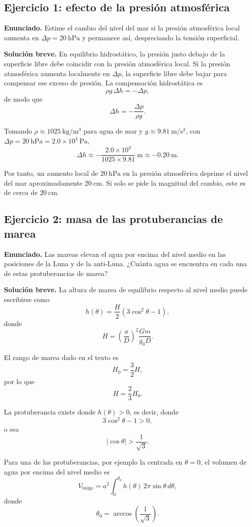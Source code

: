 \subsection{Ejercicio 1: efecto de la presión atmosférica}

\textbf{Enunciado.} Estime el cambio del nivel del mar si la presión atmosférica local aumenta en $\Delta p = 20\ \mathrm{hPa}$ y permanece así, despreciando la tensión superficial.

\textbf{Solución breve.} En equilibrio hidrostático, la presión justo debajo de la superficie libre debe coincidir con la presión atmosférica local. Si la presión atmosférica aumenta localmente en $\Delta p$, la superficie libre debe bajar para compensar ese exceso de presión. La compensación hidrostática es
$$ \rho g\,\Delta h = -\Delta p, $$
de modo que
$$ \Delta h = -\frac{\Delta p}{\rho g}. $$

Tomando $\rho \approx 1025\ \mathrm{kg/m^3}$ para agua de mar y $g \approx 9.81\ \mathrm{m/s^2}$, con $\Delta p = 20\ \mathrm{hPa} = 2.0\times 10^3\ \mathrm{Pa}$,
$$ \Delta h \approx -\frac{2.0\times 10^3}{1025 \times 9.81}\ \mathrm{m} \approx -0.20\ \mathrm{m}. $$

Por tanto, un aumento local de $20\ \mathrm{hPa}$ en la presión atmosférica deprime el nivel del mar aproximadamente $20\ \mathrm{cm}$. Si solo se pide la magnitud del cambio, este es de cerca de $20\ \mathrm{cm}$.

\subsection{Ejercicio 2: masa de las protuberancias de marea}

\textbf{Enunciado.} Las mareas elevan el agua por encima del nivel medio en las posiciones de la Luna y de la anti-Luna. ¿Cuánta agua se encuentra en cada una de estas protuberancias de marea?

\textbf{Solución breve.} La altura de marea de equilibrio respecto al nivel medio puede escribirse como
$$ h(\theta) = \frac{H}{2}(3\cos^2\theta - 1), $$
donde
$$ H = \left(\frac{a}{D}\right)^2\frac{Gm}{g_0D}. $$

El rango de marea dado en el texto es
$$ H_0 = \frac{3}{2}H, $$
por lo que
$$ H = \frac{2}{3}H_0. $$

La protuberancia existe donde $h(\theta) > 0$, es decir, donde
$$ 3\cos^2\theta - 1 > 0, $$
o sea
$$ |\cos\theta| > \frac{1}{\sqrt{3}}. $$

Para una de las protuberancias, por ejemplo la centrada en $\theta = 0$, el volumen de agua por encima del nivel medio es
$$ V_{\mathrm{bulge}} = a^2 \int_0^{\theta_0} h(\theta)\,2\pi\sin\theta\,d\theta, $$
donde
$$ \theta_0 = \arccos\left(\frac{1}{\sqrt{3}}\right). $$

